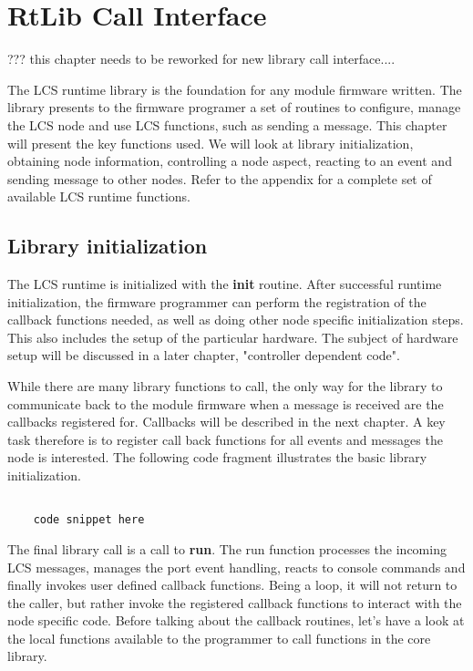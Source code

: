 \chapter{RtLib Call Interface}

??? this chapter needs to be reworked for new library call interface....

The LCS runtime library is the foundation for any module firmware written. The library presents to the firmware programer a set of routines to configure, manage the LCS node and use LCS functions, such as sending a message. This chapter will present the key functions used. We will look at library initialization, obtaining node information, controlling a node aspect, reacting to an event and sending message to other nodes.
Refer to the appendix for a complete set of available LCS runtime functions.

\section{Library initialization}

The LCS runtime is initialized with the \textbf{init} routine. After successful runtime initialization, the firmware programmer can perform the registration of the callback functions needed, as well as doing other node specific initialization steps. This also includes the setup of the particular hardware. The subject of hardware setup will be discussed in a later chapter, "controller dependent code". 

While there are many library functions to call, the only way for the library to communicate back to the module firmware when a message is received are the callbacks registered for. Callbacks will be described in the next chapter. A key task therefore is to register call back functions for all events and messages the node is interested. The following code fragment illustrates the basic library initialization.

\lstset{language=c++, style=codesnippetstyle}
\begin{lstlisting}
   
    code snippet here

\end{lstlisting}
\FloatBarrier


The final library call is a call to \textbf{run}. The run function processes the incoming LCS messages, manages the port event handling, reacts to console commands and finally invokes user defined callback functions. Being a loop, it will not return to the caller, but rather invoke the registered callback functions to interact with the node specific code. Before talking about the callback routines, let's have a look at the local functions available to the  programmer to call functions in the core library.

